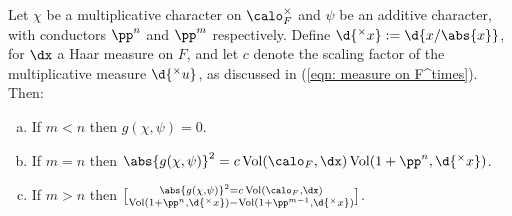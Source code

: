 \documentclass[11pt, x11names, openany]{book}
\begin{document}
\begin{lemma}
\label{lemma: gauss-sum conductor relations}
Let $\chi$ be a multiplicative character on $\calo_F^\times$ and $\psi$ be an additive character, with conductors $\pp^n$ and $\pp^m$ respectively. Define $\d{^\times x} := \d{x/\abs{x}}$, for $\dx$ a Haar measure on $F$, and let $c$ denote the scaling factor of the multiplicative measure $\d{^\times u}$, as discussed in (\ref{eqn: measure on F^times}). Then:
\begin{enumerate}[(a)]
    \item If $m < n$ then $g(\chi, \psi) = 0$.
    \item If $m = n$ then $\abs{g(\chi, \psi)}^2 = c \vol(\calo_F, \dx) \vol(1 + \pp^n, \d{^\times x})$.
    \item If $m > n$ then $\abs{g(\chi, \psi)}^2 = c \vol(\calo_F, \dx) \brack{\vol(1 + \pp^n, \d{^\times x}) - \vol(1 + \pp^{m-1}, \d{^\times x})}$.
\end{enumerate}
\end{lemma}
\end{document}
